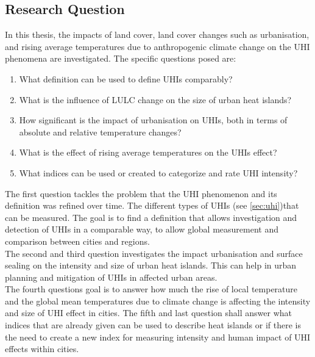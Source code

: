 \documentclass[12pt,a4paper, english,twoside]{article}
\begin{document}
 \subsection{Research Question}
  In this thesis, the impacts of land cover, land cover changes such as urbanisation, and rising average temperatures due to anthropogenic climate change on the \gls{UHI} phenomena are investigated.
  The specific questions posed are:
  \begin{enumerate}
    \item What definition can be used to define \glspl{UHI} comparably?\label{q1}
    \item What is the influence of \gls{LULC} change on the size of urban heat islands?\label{q2}
    \item How significant is the impact of urbanisation on \glspl{UHI}, both in terms of absolute and relative temperature changes?\label{q3}
    \item What is the effect of rising average temperatures on the \glspl{UHI} effect?\label{q4}
    \item What indices can be used or created to categorize and rate \gls{UHI} intensity?\label{q5}
  \end{enumerate}
  The first question tackles the problem that the \gls{UHI} phenomenon and its definition was refined over time. 
The different types of \glspl{UHI} (see \cref{sec:uhi})that can be measured. 
  The goal is to find a definition that allows investigation and detection of \glspl{UHI} in a comparable way, to allow global measurement and comparison between cities and regions.\\ 
  The second and third question investigates the impact urbanisation and surface sealing on the intensity and size of urban heat islands. 
  This can help in urban planning and mitigation of \glspl{UHI} in affected urban areas.\\ 
  The fourth questions goal is to answer how much the rise of local temperature and the global mean temperatures due to climate change is affecting the intensity and size of \gls{UHI} effect in cities.%
  The fifth and last question shall answer what indices that are already given can be used to describe heat islands or if there is the need to create a new index for measuring intensity and human impact of \gls{UHI} effects within cities.
\end{document}
